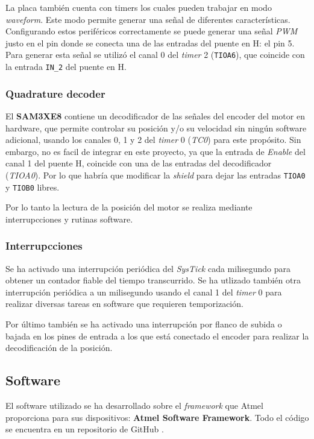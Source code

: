 \documentclass[a4paper]{article}
\begin{document}
La placa también cuenta con timers los cuales pueden trabajar en modo \emph{waveform}.
Este modo permite generar una señal de diferentes características.
Configurando estos periféricos correctamente se puede generar una señal \emph{PWM} justo en el pin donde se conecta una de las entradas del puente en H: el pin 5.
Para generar esta señal se utilizó el canal 0 del \emph{timer} 2 (\texttt{TIOA6}), que coincide con la entrada \texttt{IN\_2} del puente en H.

\subsubsection{Quadrature decoder}
El \textbf{SAM3XE8} contiene un decodificador de las señales del encoder del motor en hardware,
que permite controlar su posición y/o su velocidad sin ningún software adicional, usando los canales 0, 1 y 2 del \emph{timer} 0 (\emph{TC0}) para este propósito.
Sin embargo, no es facil de integrar en este proyecto, ya que la entrada de \emph{Enable} del canal 1 del puente H, coincide con una de las entradas del decodificador (\emph{TIOA0}).
Por lo que habría que modificar la \emph{shield} para dejar las entradas \texttt{TIOA0} y \texttt{TIOB0} libres.

Por lo tanto la lectura de la posición del motor se realiza mediante interrupcciones y rutinas software.

\subsubsection{Interrupcciones}
Se ha activado una interrupción periódica del \emph{SysTick} cada milisegundo para obtener un contador fiable del tiempo transcurrido.
Se ha utlizado también otra interrupción periódica a un milisegundo usando el canal 1 del \emph{timer} 0 para realizar diversas tareas en software que requieren temporización.

Por último también se ha activado una interrupción por flanco de subida o bajada en los pines de entrada a los que está conectado el encoder para realizar la decodificación de la posición.

\subsection{Software \label{sec:software}}
El software utilizado se ha desarrollado sobre el \emph{framework} que Atmel proporciona para sus dispositivos: \textbf{Atmel Software Framework}.
Todo el código se encuentra en un repositorio de GitHub \cite{git}.
\end{document}

